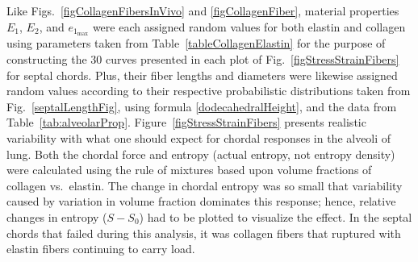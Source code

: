 Like Figs.~\ref{figCollagenFibersInVivo} and \ref{figCollagenFiber}, material properties $E_1$, $E_2$, and $e_{1_{\max}}$ were each assigned random values for both elastin and collagen using parameters taken from Table~\ref{tableCollagenElastin} for the purpose of constructing the 30 curves presented in each plot of Fig.~\ref{figStressStrainFibers} for septal chords.  Plus, their fiber lengths and diameters were likewise assigned random values according to their respective probabilistic distributions taken from Fig.~\ref{septalLengthFig}, using formula \ref{dodecahedralHeight}, and the data from Table~\ref{tab:alveolarProp}.  Figure~\ref{figStressStrainFibers} presents realistic variability with what one should expect for chordal responses in the alveoli of lung.  Both the chordal force and entropy (actual entropy, not entropy density) were calculated using the rule of mixtures based upon volume fractions of collagen vs.\ elastin.  The change in chordal entropy was so small that variability caused by variation in volume fraction dominates this response; hence, relative changes in entropy ($S \! - \! S_0$) had to be plotted to visualize the effect.  In the septal chords that failed during this analysis, it was collagen fibers that ruptured with elastin fibers continuing to carry load.  


